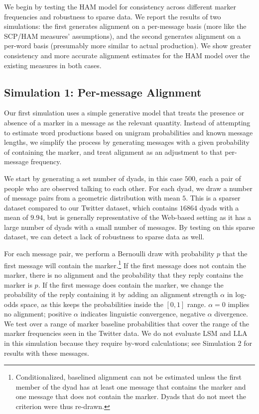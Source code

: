 \documentclass{acm_proc_article-sp}
\begin{document}
We begin by testing the HAM model for consistency across different marker frequencies and robustness to sparse data.  We report the results of two simulations: the first generates alignment on a per-message basis (more like the SCP/HAM measures' assumptions), and the second generates alignment on a per-word basis (presumably more similar to actual production).  We show greater consistency and more accurate alignment estimates for the HAM model over the existing measures in both cases.

\subsection{Simulation 1: Per-message Alignment}

Our first simulation uses a simple generative model that treats the presence or absence of a marker in a message as the relevant quantity. Instead of attempting to estimate word productions based on unigram probabilities and known message lengths, we simplify the process by generating messages with a given probability of containing the marker, and treat alignment as an adjustment to that per-message frequency.

We start by generating a set number of dyads, in this case $500$, each a pair of people who are observed talking to each other. For each dyad, we draw a number of message pairs from a geometric distribution with mean $5$.  This is a sparser dataset compared to our Twitter dataset, which contains $16864$ dyads with a mean of $9.94$, but is generally representative of the Web-based setting as it has a large number of dyads with a small number of messages. By testing on this sparse dataset, we can detect a lack of robustness to sparse data as well.

For each message pair, we perform a Bernoulli draw with probability $p$ that the first message will contain the marker.\footnote{Conditionalized, baselined alignment can not be estimated unless the first member of the dyad has at least one message that contains the marker and one message that does not contain the marker. Dyads that do not meet the criterion were thus re-drawn.}  If the first message does not contain the marker, there is no alignment and the probability that they reply contains the marker is $p$. If the first message does contain the marker, we change the probability of the reply containing it by adding an alignment strength $\alpha$ in log-odds space, as this keeps the probabilities inside the $[0,1]$ range. $\alpha = 0$ implies no alignment; positive $\alpha$ indicates linguistic convergence, negative $\alpha$ divergence.  We test over a range of marker baseline probabilities that cover the range of the marker frequencies seen in the Twitter data.  We do not evaluate LSM and LLA in this simulation because they require by-word calculations; see Simulation 2 for results with these messages.
\end{document}
